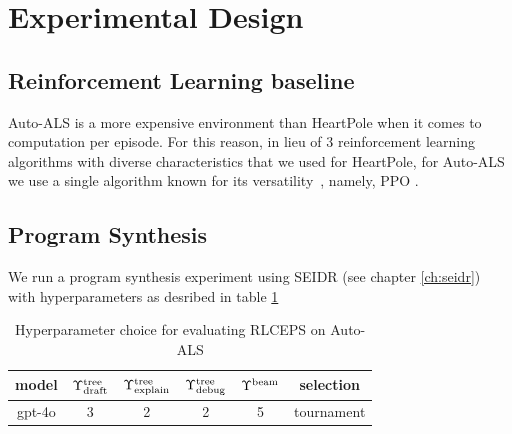 \newpage
\section{Experimental Design}
\subsection{Reinforcement Learning baseline}

Auto-ALS is a more expensive environment than HeartPole when it comes to computation per episode.
For this reason, in lieu of 3 reinforcement learning algorithms with diverse characteristics that we used for HeartPole, for Auto-ALS we use a single algorithm known for its versatility~\cite{alaghaTargetLocalizationUsing2022, bilbanOptimizingAutonomousVehicle2025, bohnDeepReinforcementLearning2019, coreccoProximalPolicyOptimizationbased2023, funikaAutomatedCloudResources2023, hasankhaniIntegratedPathPlanning2023, huangImprovingTrafficSignal2023, kalusivalingamOptimizingIndustrialSystems2020, kleinOptimizingParametersSwarm2024, liIntelligentDecisionJoint2025, liuApplicationAdvancedTree2022, lopesIntelligentControlQuadrotor2018, luAdaptiveEnergyManagement2024, maMultiuserMobileEdge2024, maTaskOffloadingScheme2025, mayerModularProductionControl2021, meloLearningHumanoidRobot2019, mengProximalPolicyOptimization2023, ouyangTokenlevelProximalPolicy2024, pinciroliDeepReinforcementLearning2021, proctorProximalPolicyOptimization2021, quangtranProximalPolicyOptimization2020, rehmanReinforcementLearningdrivenProximal2024, silvaControlConventionalContinuous2024, silvaTemporalGraphTraversals2020, vanvuchelenUseProximalPolicy2020, weiMixedautonomyTrafficControl2019, wuCombustionOptimizationStudy2024, wuProximalPolicyOptimization2023, yeAutomatedLaneChange2020, yinHyperheuristicAlgorithmProximal2024, zhangProximalPolicyOptimization2024, zhangRealtimeAutonomousLine2020, zhaoPPOTAAdaptiveTask2023}, namely, PPO \cite{schulmanProximalPolicyOptimization2017}. 

\subsection{Program Synthesis}

We run a program synthesis experiment using SEIDR (see chapter \ref{ch:seidr}) with hyperparameters as desribed in table \ref{tab:rlceps-auto-als}

\begin{table}
    \centering
    \begin{tabular}{|c|c|c|c|c|c|}
        model & $\Upsilon^\text{tree}_\text{draft}$ & $\Upsilon^\text{tree}_\text{explain}$ & $\Upsilon^\text{tree}_\text{debug}$ & $\Upsilon^\text{beam}$ & selection \\
        \midrule
        gpt-4o & 3 & 2 & 2 & 5 & tournament
    \end{tabular}
    \caption{Hyperparameter choice for evaluating RLCEPS on Auto-ALS}
    \label{tab:rlceps-auto-als}
\end{table}

